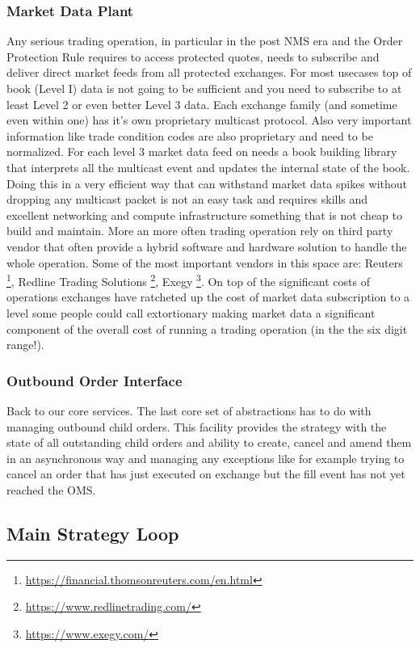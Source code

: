 \subsubsection{Market Data Plant} 
Any serious trading operation, in particular in the post NMS era and the Order Protection Rule requires to access protected quotes, needs to subscribe and deliver direct market feeds from all protected exchanges. For most usecases top of book (Level I) data is not going to be sufficient and you need to subscribe to at least Level 2 or even better Level 3 data. Each exchange family (and sometime even within one) has it's own proprietary multicast protocol. Also very important information like trade condition codes are also proprietary and need to be normalized. For each level 3 market data feed on needs a book building library that interprets all the multicast event and updates the internal state of the book. Doing this in a very efficient way that can withstand market data spikes without dropping any multicast packet is not an easy task and requires skills and excellent networking and compute infrastructure something that is not cheap to build and maintain. More an more often trading operation rely on third party vendor that often provide a hybrid software and hardware solution to handle the whole operation. Some of the most important vendors in this space are: Reuters \footnote{\url{https://financial.thomsonreuters.com/en.html}}, Redline  Trading Solutions \footnote{\url{https://www.redlinetrading.com/}}, Exegy \footnote{\url{https://www.exegy.com/}}.
On top of the significant costs of operations  exchanges have ratcheted up the cost of market data subscription to a level some people could call extortionary making market data a significant component of the overall cost of running a trading operation (in the the six digit range!).
\subsubsection{Outbound Order Interface}
Back to our core services. The last core set of abstractions has to do with managing outbound child orders. This facility provides the strategy with the state of all outstanding child orders and ability to create, cancel and amend them in an asynchronous way and managing any exceptions like for example trying to cancel an order that has just executed on exchange but the fill event has not yet reached the OMS. 

\subsection{Main Strategy Loop}

